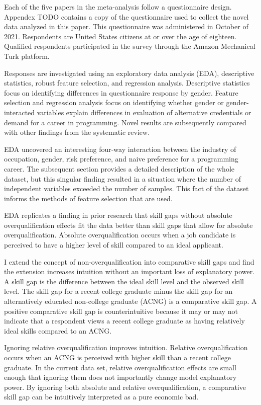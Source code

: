 \documentclass[review]{elsarticle}
\begin{document}
Each of the five papers in the meta-analysis follow a questionnaire design.
Appendex TODO contains a copy of the questionnaire used to collect the novel data analyzed in this paper.
This questionnaire was administered in October of 2021.
Respondents are United States citizens at or over the age of eighteen.
Qualified respondents participated in the survey through the Amazon Mechanical Turk platform.

Responses are investigated using an exploratory data analysis (EDA),
descriptive statistics,
robust feature selection,
and regression analysis.
Descriptive statistics focus on identifying differences in questionnaire response by gender.
Feature selection and regression analysis focus on identifying whether gender or gender-interacted variables
explain differences in evaluation of alternative credentials or demand for a career in programming.
Novel results are subsequently compared with other findings from the systematic review.

EDA uncovered an interesting four-way interaction between
the industry of occupation, gender, risk preference, and naive preference for a programming career.
The subsequent section provides a detailed description of the whole dataset,
but this singular finding resulted in a situation where the number of independent variables exceeded the number of samples.
This fact of the dataset informs the methods of feature selection that are used.

EDA replicates a finding in prior research that skill gaps without absolute overqualification effects
fit the data better than skill gaps that allow for absolute overqualification. %
Absolute overqualification occurs when a job candidate is perceived to have a higher level of skill
compared to an ideal applicant.

I extend the concept of non-overqualification into comparative skill gaps and find the extension increases intuition without an important loss of explanatory power.
A skill gap is the difference between the ideal skill level and the observed skill level.
The skill gap for a recent college graduate minus the skill gap for an alternatively educated non-college graduate (ACNG) is a comparative skill gap.
A positive comparative skill gap is counterintuitive because it may or may not indicate that a
respondent views a recent college graduate as having relatively ideal skills compared to an ACNG.

Ignoring relative overqualification improves intuition.
Relative overqualification occurs when an ACNG is perceived with higher skill than a recent college graduate.
In the current data set, relative overqualification effects are small enough that ignoring them does not importantly change model explanatory power.
By ignoring both absolute and relative overqualification,
a comparative skill gap can be intuitively interpreted as a pure economic bad.
\end{document}
